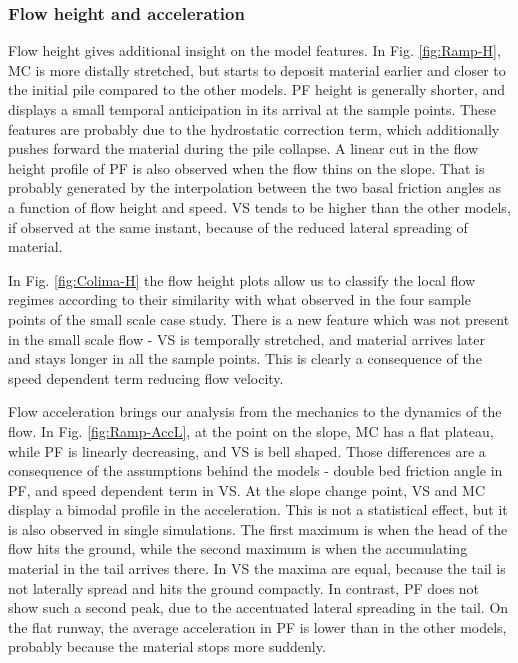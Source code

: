 \documentclass{article}
\begin{document}
\subsubsection{Flow height and acceleration}
Flow height gives additional insight on the model features. In Fig. \ref{fig:Ramp-H}, MC is more distally stretched, but starts to deposit material earlier and closer to the initial pile compared to the other models. PF height is generally shorter, and displays a small temporal anticipation in its arrival at the sample points. These features are probably due to the hydrostatic correction term, which additionally pushes forward the material during the pile collapse. A linear cut in the flow height profile of PF is also observed when the flow thins on the slope. That is probably generated by the interpolation between the two basal friction angles as a function of flow height and speed. VS tends to be higher than the other models, if observed at the same instant, because of the reduced lateral spreading of material.

In Fig. \ref{fig:Colima-H} the flow height plots allow us to classify the local flow regimes according to their similarity with what observed in the four sample points of the small scale case study. There is a new feature which was not present in the small scale flow - VS is temporally stretched, and material arrives later and stays longer in all the sample points. This is clearly a consequence of the speed dependent term reducing flow velocity.

Flow acceleration brings our analysis from the mechanics to the dynamics of the flow. In Fig. \ref{fig:Ramp-AccL}, at the point on the slope, MC has a flat plateau, while PF is linearly decreasing, and VS is bell shaped. Those differences are a consequence of the assumptions behind the models - double bed friction angle in PF, and speed dependent term in VS. At the slope change point, VS and MC display a bimodal profile in the acceleration. This is not a statistical effect, but it is also observed in single simulations. The first maximum is when the head of the flow hits the ground, while the second maximum is when the accumulating material in the tail arrives there. In VS the maxima are equal, because the tail is not laterally spread and hits the ground compactly. In contrast, PF does not show such a second peak, due to the accentuated lateral spreading in the tail. On the flat runway, the average acceleration in PF is lower than in the other models, probably because the material stops more suddenly.
\end{document}
